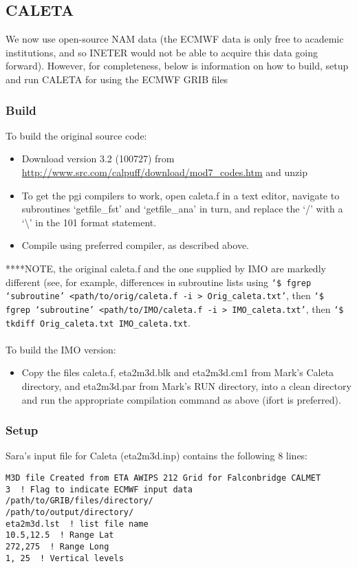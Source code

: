 \documentclass[10pt,a4paper]{article}
\begin{document}
\subsection{CALETA}
We now use open-source NAM data (the ECMWF data is only free to academic institutions, and so INETER would not be able to acquire this data going forward). However, for completeness, below is information on how to build, setup and run CALETA for using the ECMWF GRIB files
\subsubsection{Build}
To build the original source code:
\begin{itemize}
\item Download version 3.2 (100727) from \url{http://www.src.com/calpuff/download/mod7_codes.htm} and unzip
\item To get the pgi compilers to work, open caleta.f in a text editor, navigate to subroutines `getfile\_fst' and `getfile\_ana' in turn, and replace the `/' with a `\textbackslash' in the 101 format statement.
\item Compile using preferred compiler, as described above.
\end{itemize}
****NOTE, the original caleta.f and the one supplied by IMO are markedly different (see, for example, differences in subroutine lists using \texttt{`\$ fgrep `subroutine' <path/to/orig/caleta.f -i > Orig\_caleta.txt'}, then \texttt{`\$ fgrep `subroutine' <path/to/IMO/caleta.f -i > IMO\_caleta.txt'}, then \texttt{`\$ tkdiff Orig\_caleta.txt IMO\_caleta.txt}.\\\\
To build the IMO version:
\begin{itemize}
\item Copy the files caleta.f, eta2m3d.blk and eta2m3d.cm1 from Mark's Caleta directory, and eta2m3d.par from Mark's RUN directory, into a clean directory and run the appropriate compilation command as above (ifort is preferred).
\end{itemize}

\subsubsection{Setup}
Sara's input file for Caleta (eta2m3d.inp) contains the following 8 lines:
\begin{lstlisting}
M3D file Created from ETA AWIPS 212 Grid for Falconbridge CALMET 
3  ! Flag to indicate ECMWF input data
/path/to/GRIB/files/directory/
/path/to/output/directory/
eta2m3d.lst  ! list file name
10.5,12.5  ! Range Lat
272,275  ! Range Long
1, 25  ! Vertical levels
\end{lstlisting}
\end{document}
